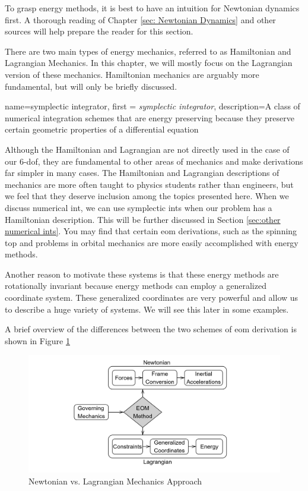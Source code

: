 \documentclass[12pt]{report}
\begin{document}
To grasp energy methods, it is best to have an intuition for Newtonian dynamics first. A thorough reading of Chapter \ref{sec: Newtonian Dynamics} and other sources will help prepare the reader for this section.

There are two main types of energy mechanics, referred to as Hamiltonian and \gls{Lagrangian} Mechanics. In this chapter, we will mostly focus on the \gls{Lagrangian} version of these mechanics. Hamiltonian mechanics are arguably more fundamental, but will only be briefly discussed.

{
    name=symplectic integrator,
    first = {\textit{symplectic integrator}},
    description={A class of numerical integration schemes that are energy preserving because they preserve certain geometric properties of a differential equation}
}

Although the Hamiltonian and \gls{Lagrangian} are not directly used in the case of our 6-\gls{dof}, they are fundamental to other areas of mechanics and make derivations far simpler in many cases. The Hamiltonian and \gls{Lagrangian} descriptions of mechanics are more often taught to physics students rather than engineers, but we feel that they deserve inclusion among the topics presented here. When we discuss \gls{numerical int}, we can use \glspl{symplectic int} when our problem has a Hamiltonian description. This will be further discussed in Section \ref{sec:other numerical ints}. You may find that certain \gls{eom} derivations, such as the spinning top and problems in orbital mechanics are more easily accomplished with energy methods.

Another reason to motivate these systems is that these energy methods are rotationally invariant because energy methods can employ a generalized coordinate system. These generalized coordinates are very powerful and allow us to describe a huge variety of systems. We will see this later in some examples.

A brief overview of the differences between the two schemes of \gls{eom} derivation is shown in Figure \ref{fig:newt v lang}

\begin{figure}[ht]
    \centering
    
\includegraphics[width=\linewidth]{Images/diagram-20250322.png}

    \caption{Newtonian vs. Lagrangian Mechanics Approach}
    \label{fig:newt v lang}
\end{figure}
\end{document}
